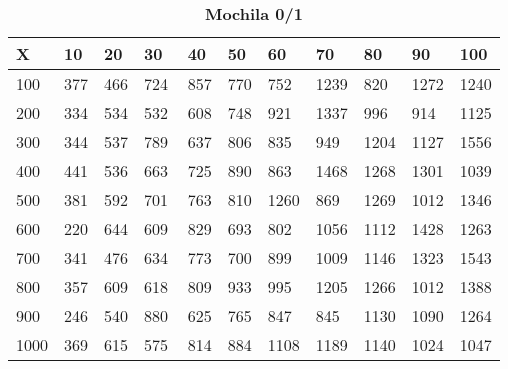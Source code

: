 \documentclass[10pt,letterpaper]{article}
\begin{document}
\newpage 
{}
\begin{center}
\begin{table}\renewcommand{\arraystretch}{2.5}
\caption{\large \textbf{Mochila 0/1}}
\centering
\begin{tabular} { |m{0.5cm}|m{1.3cm}|m{1.3cm}|m{1.3cm}|m{1.3cm}|m{1.3cm}|m{1.3cm}|m{1.3cm}|m{1.3cm}|m{1.3cm}|m{1.3cm}|} 
\hline
\rowcolor{Gray}
\centering \textbf{X} & \centering \textbf{10} & \centering \textbf{20} & \centering \textbf{30}\ & \centering \textbf{40} & \centering \textbf{50} & \centering \textbf{60}\ & \centering \textbf{70} & \centering \textbf{80} & \centering \textbf{90}\ & \textbf{100} \\\hline
\cellcolor{Gray}100 & \Large 377 & \Large 466 & \Large 724 & \Large 857 & \Large 770 & \Large 752 & \Large 1239 & \Large 820 & \Large 1272 & \Large 1240 \\
\hline
\cellcolor{Gray}200 & \Large 334 & \Large 534 & \Large 532 & \Large 608 & \Large 748 & \Large 921 & \Large 1337 & \Large 996 & \Large 914 & \Large 1125 \\
\hline
\cellcolor{Gray}300 & \Large 344 & \Large 537 & \Large 789 & \Large 637 & \Large 806 & \Large 835 & \Large 949 & \Large 1204 & \Large 1127 & \Large 1556 \\
\hline
\cellcolor{Gray}400 & \Large 441 & \Large 536 & \Large 663 & \Large 725 & \Large 890 & \Large 863 & \Large 1468 & \Large 1268 & \Large 1301 & \Large 1039 \\
\hline
\cellcolor{Gray}500 & \Large 381 & \Large 592 & \Large 701 & \Large 763 & \Large 810 & \Large 1260 & \Large 869 & \Large 1269 & \Large 1012 & \Large 1346 \\
\hline
\cellcolor{Gray}600 & \Large 220 & \Large 644 & \Large 609 & \Large 829 & \Large 693 & \Large 802 & \Large 1056 & \Large 1112 & \Large 1428 & \Large 1263 \\
\hline
\cellcolor{Gray}700 & \Large 341 & \Large 476 & \Large 634 & \Large 773 & \Large 700 & \Large 899 & \Large 1009 & \Large 1146 & \Large 1323 & \Large 1543 \\
\hline
\cellcolor{Gray}800 & \Large 357 & \Large 609 & \Large 618 & \Large 809 & \Large 933 & \Large 995 & \Large 1205 & \Large 1266 & \Large 1012 & \Large 1388 \\
\hline
\cellcolor{Gray}900 & \Large 246 & \Large 540 & \Large 880 & \Large 625 & \Large 765 & \Large 847 & \Large 845 & \Large 1130 & \Large 1090 & \Large 1264 \\
\hline
\cellcolor{Gray}1000 & \Large 369 & \Large 615 & \Large 575 & \Large 814 & \Large 884 & \Large 1108 & \Large 1189 & \Large 1140 & \Large 1024 & \Large 1047 \\
\hline
\end{tabular} \\
\end{table}
\end{center}
\end{document}
